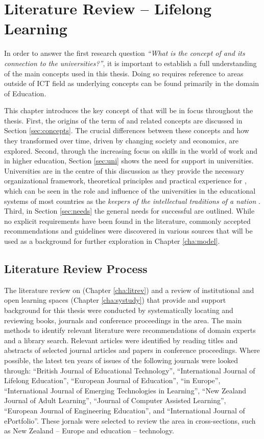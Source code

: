 \chapter{Literature Review -- Lifelong Learning \label{cha:litrev}}
In order to answer the first research question \textit{``What is the concept of
\LLLs and its connection to the universities?''}, it is important to establish a
full understanding of the main concepts used in this thesis. Doing so requires 
reference to areas outside of ICT field as underlying concepts can be found
primarily in the domain of Education.

This chapter introduces the key concept of \LLLs that will be in focus
throughout the thesis. First, the origins of the term of \textit{\LLLsn} and
related concepts are discussed in Section \ref{sec:concepts}. The crucial
differences between these concepts and how they transformed over time, driven by
changing society and economics, are explored. Second, through the increasing
focus on \LLLs skills in the world of work and in higher education, Section
\ref{sec:uni} shows the need for \LLLs support in universities. Universities are
in the centre of this discussion as they provide the necessary organizational
framework, theoretical principles and practical experience for \LLLs
\citep{Knapper2000}, which can be seen in the role and influence of the
universities in the educational systems of most countries as the \textit{keepers
of the intellectual traditions of a nation} \citep[p.~96]{Longworth2003}. Third,
in Section \ref{sec:needs} the general needs for successful \LLLs are outlined.
While no explicit requirements have been found in the literature, commonly
accepted recommendations and guidelines were discovered in various sources that
will be used as a background for further exploration in Chapter \ref{cha:model}.

\section{Literature Review Process}
The literature review on \LLLs (Chapter \ref{cha:litrev}) and a review of
institutional and open learning spaces (Chapter \ref{cha:systudy}) that provide
and support background for this thesis were conducted by systematically locating
and reviewing books, journals and conference proceedings in the area. The main
methods to identify relevant literature were recommendations of domain experts
and a library search. Relevant articles were identified by reading titles and
abstracts of selected journal articles and papers in conference proceedings.
Where possible, the latest ten years of issues of the following journals were
looked through: ``British Journal of Educational Technology'', ``International
Journal of Lifelong Education'', ``European Journal of Education'', ``\LLLc in
Europe'', ``International Journal of Emerging Technologies in Learning'', ``New
Zealand Journal of Adult Learning'', ``Journal of Computer Assisted Learning'',
``European Journal of Engineering Education'', and ``International Journal of
ePortfolio''. These jornals were selected to review the area in cross-sections,
such as New Zealand -- Europe and education -- technology.

